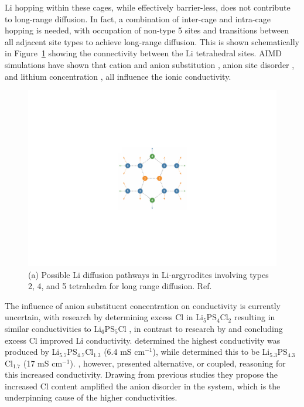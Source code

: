 \documentclass[../main.tex]{subfiles}
\begin{document}
Li hopping within these cages, while effectively barrier-less, does not contribute to long-range diffusion. In fact, a combination of inter-cage and intra-cage hopping is needed, with occupation of non-type 5 sites and transitions between all adjacent site types to achieve long-range diffusion. This is shown schematically in Figure~\ref{fig:diffusion_pathways} showing the connectivity between the Li tetrahedral sites. AIMD simulations have shown that cation and anion substitution \cite{ohno2019further,deklerk2016}, anion site disorder \cite{gautamengineering,morgan2020mechanistic}, and lithium concentration \cite{Deng2017, yu_superionic_2020, Feng_2020}, all influence the ionic conductivity.

\begin{figure}
    \centering
    \includegraphics[scale=0.65]{figures/diffusion_pathways.pdf}
    \caption{(a) Possible Li diffusion pathways in Li-argyrodites involving types 2, 4, and 5 tetrahedra for long range diffusion. Ref. }
    \label{fig:diffusion_pathways}
\end{figure}

The influence of anion substituent concentration on conductivity is currently uncertain, with research by \citeauthor{deklerk2016} determining excess Cl in Li$_5$PS$_4$Cl$_2$ resulting in similar conductivities to Li$_6$PS$_5$Cl \cite{deklerk2016}, in contrast to research by \citeauthor{yu2019tailoring} and \citeauthor{Feng_2020} concluding excess Cl improved Li conductivity. \citeauthor{yu2019tailoring} determined the highest conductivity was produced by Li$_{5.7}$PS$_{4.7}$Cl$_{1.3}$ (6.4 mS cm$^{-1}$), \cite{yu2019tailoring,yu_superionic_2020} while \citeauthor{Feng_2020} determined this to be Li$_{5.3}$PS$_{4.3}$Cl$_{1.7}$ (17 mS cm$^{-1}$). \cite{Feng_2020} \citeauthor{Feng_2020}, however, presented alternative, or coupled, reasoning for this increased conductivity. Drawing from previous studies \cite{adeli2019,zhou_solvent-engineered_2019} they propose the increased Cl content amplified the anion disorder in the system, which is the underpinning cause of the higher conductivities.
\end{document}
